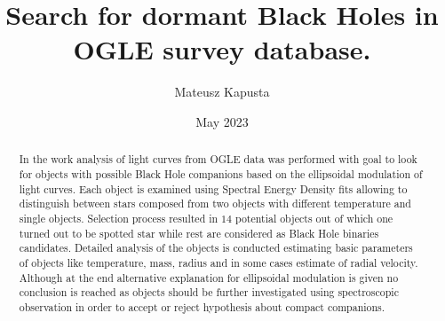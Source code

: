 \documentclass{pracalicmgr}
\author{Mateusz Kapusta}
\title{Search for dormant Black Holes in OGLE survey database.}
\date{May 2023}
\begin{document}
    \maketitle
    \let\cleardoublepage\clearpage
\begin{abstract}
    In the work analysis of light curves from OGLE data was performed with goal to look for objects with possible Black Hole companions based on the 
    ellipsoidal modulation of light curves. Each object is examined using Spectral Energy Density fits allowing to distinguish between stars 
    composed from two objects with different temperature and single objects. Selection process resulted in $14$ potential objects out of which 
    one turned out to be spotted star while rest are considered as Black Hole binaries candidates. Detailed analysis of the objects is conducted 
    estimating basic parameters of objects like temperature, mass, radius and in some cases estimate of radial velocity. Although at the end 
    alternative explanation for ellipsoidal modulation is given no conclusion is reached as objects should be further investigated using 
    spectroscopic observation in order to accept or reject hypothesis about compact companions.
\end{abstract}

\tableofcontents
\end{document}
